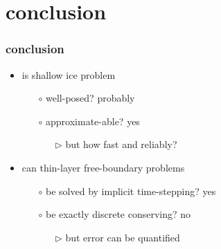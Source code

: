 \documentclass[hide notes,intlimits]{beamer}
\begin{document}
\section*{conclusion}

\begin{frame}
  \frametitle{conclusion}

\begin{itemize}
\item is shallow ice problem
  \begin{itemize}
  \item[$\circ$] well-posed? \qquad \alert{probably}
  \item[$\circ$] approximate-able? \qquad \alert{yes}
     \begin{itemize}
     \item[$\triangleright$] but how fast and reliably?
     \end{itemize}
  \end{itemize}
\item can thin-layer free-boundary problems
  \begin{itemize}
  \item[$\circ$] be solved by implicit time-stepping? \qquad \alert{yes}
  \item[$\circ$] be exactly discrete conserving? \qquad \alert{no}
     \begin{itemize}
     \item[$\triangleright$] but error can be quantified
     \end{itemize}
  \end{itemize}
\end{itemize}
\end{frame}
\end{document}
